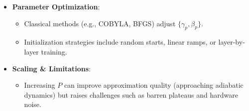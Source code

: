 \begin{multicols}{3}
\begin{itemize}[leftmargin=*,nosep,topsep=0pt]
      \item \textbf{Parameter Optimization}:
        \begin{itemize}[nosep]
          \item Classical methods (e.g., COBYLA, BFGS) adjust \(\{\gamma_p,\beta_p\}\).
          \item Initialization strategies include random starts, linear
            ramps, or layer-by-layer training.
        \end{itemize}
      \item \textbf{Scaling \& Limitations}:
        \begin{itemize}[nosep]
          \item Increasing \(P\) can improve approximation quality
            (approaching adiabatic dynamics) but raises challenges such as
            barren plateaus and hardware noise.
        \end{itemize}
    \end{itemize}


\end{multicols}
